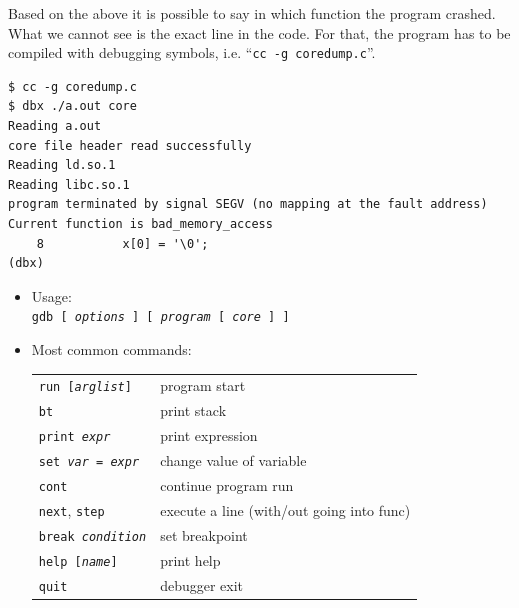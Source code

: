 \begin{itemize}
Based on the above it is possible to say in which function the program crashed.
What we cannot see is the exact line in the code. For that, the program has to be
compiled with debugging symbols, i.e. ``\texttt{cc -g coredump.c}''.

\begin{verbatim}
$ cc -g coredump.c
$ dbx ./a.out core
Reading a.out
core file header read successfully
Reading ld.so.1
Reading libc.so.1
program terminated by signal SEGV (no mapping at the fault address)
Current function is bad_memory_access
    8           x[0] = '\0';
(dbx) 
\end{verbatim}

\end{itemize}


\begin{slide}
\begin{itemize}
\item Usage:\\
\texttt{gdb [ \emph{options} ] [ \emph{program} [ \emph{core} ] ]}
\item Most common commands:\\
\renewcommand{\arraystretch}{0.9}
\begin{tabular}{ll}
\texttt{run [\emph{arglist}]} & program start\\
\texttt{bt} & print stack\\
\texttt{print \emph{expr}} & print expression\\
\texttt{set \emph{var} = \emph{expr}} & change value of variable\\
\texttt{cont} & continue program run\\
\texttt{next}, \texttt{step} & execute a line (with/out going into func)\\
\texttt{break \emph{condition}} & set breakpoint\\
\texttt{help [\emph{name}]} & print help\\
\texttt{quit} & debugger exit
\end{tabular}
\end{itemize}
\end{slide}

